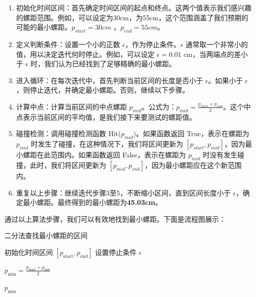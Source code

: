 \documentclass[withoutpreface, bwprint]{cumcmthesis} %
\begin{document}
\begin{enumerate}
    \item 初始化时间区间：首先确定时间区间的起点和终点。这两个值表示我们感兴趣的螺距范围。例如，可以设定为30cm，为55cm，这个范围涵盖了我们预期的可能的最小螺距。$p_{start} = 30cm$ ，$p_{end} = 55 cm$。
    \item 定义判断条件：设置一个小的正数 $\epsilon$，作为停止条件。$\epsilon$ 通常取一个非常小的值，用以决定迭代何时停止。例如，可以设定 $\epsilon = 0.01$ cm，当两端点的差小于 $\epsilon$ 时，我们认为已经找到了足够精确的最小螺距。
    \item 进入循环：在每次迭代中，首先判断当前区间的长度是否小于 $\epsilon$。如果小于 $\epsilon$，则停止迭代，并确定最小螺距。否则，继续以下步骤。
    \item 计算中点：计算当前区间的中点螺距 $p_{mid}$。公式为：$p_{mid} = \frac{p_{start} + p_{end}}{2}$。这个中点表示当前区间的平均值，是我们接下来要测试的螺距值。
    \item 碰撞检测：调用碰撞检测函数 Hit($p_{mid}$)。如果函数返回 True，表示在螺距为 $p_{mid}$ 时发生了碰撞，在这种情况下，我们将区间更新为 $[p_{start}, p_{mid}]$，因为最小螺距在此范围内。如果函数返回 False，表示在螺距为 $p_{mid}$ 时没有发生碰撞，此时，我们将区间更新为 $[p_{mid}, p_{end}]$，因为最小螺距应在这个新范围内。
    \item 重复以上步骤：继续迭代步骤3至5，不断缩小区间，直到区间长度小于 $\epsilon$，确定最小螺距。最终得到的最小螺距为\textbf{45.03cm}。
\end{enumerate}

通过以上算法步骤，我们可以有效地找到最小螺距。下面是流程图展示：


\begin{algorithm}
    \caption{二分法查找最小螺距的区间}

    初始化时间区间 $[p_{\text{start}}, p_{\text{end}}]$ \;
    设置停止条件 $\epsilon$ \;


    $p_{\text{min}} = \frac{p_{\text{start}} + p_{\text{end}}}{2}$ \;

    \Return $p_{\text{min}}$ \;
\end{algorithm}
\end{document}
